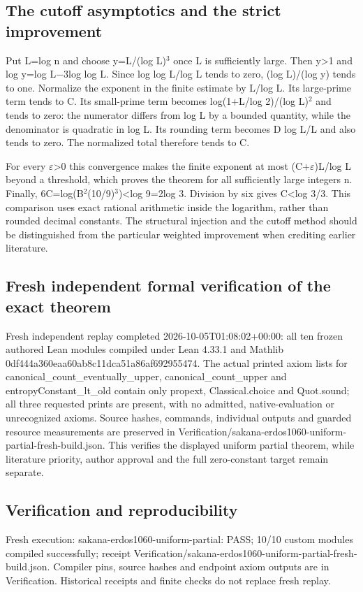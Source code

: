 \documentclass[11pt,a4paper]{article}
\begin{document}
\subsection{The cutoff asymptotics and the strict improvement}
Put L=log n and choose y=L/(log L)\ensuremath{^3} once L is sufficiently large. Then y>1 and log y=log L\ensuremath{-}3log log L. Since log log L/log L tends to zero, (log L)/(log y) tends to one. Normalize the exponent in the finite estimate by L/log L. Its large-prime term tends to C. Its small-prime term becomes log(1+L/log 2)/(log L)\ensuremath{^2} and tends to zero: the numerator differs from log L by a bounded quantity, while the denominator is quadratic in log L. Its rounding term becomes D log L/L and also tends to zero. The normalized total therefore tends to C.

For every \ensuremath{\varepsilon}>0 this convergence makes the finite exponent at most (C+\ensuremath{\varepsilon})L/log L beyond a threshold, which proves the theorem for all sufficiently large integers n. Finally, 6C=log(B\ensuremath{^2}(10/9)\ensuremath{^3})<log 9=2log 3. Division by six gives C<log 3/3. This comparison uses exact rational arithmetic inside the logarithm, rather than rounded decimal constants. The structural injection and the cutoff method should be distinguished from the particular weighted improvement when crediting earlier literature.

\subsection{Fresh independent formal verification of the exact theorem}
Fresh independent replay completed 2026-10-05T01:08:02+00:00: all ten frozen authored Lean modules compiled under Lean 4.33.1 and Mathlib 0df444a360eaa60ab8c11dca51a86af692955474. The actual printed axiom lists for canonical\_count\_eventually\_upper, canonical\_count\_upper and entropyConstant\_lt\_old contain only propext, Classical.choice and Quot.sound; all three requested prints are present, with no admitted, native-evaluation or unrecognized axioms. Source hashes, commands, individual outputs and guarded resource measurements are preserved in Verification/sakana-erdos1060-uniform-partial-fresh-build.json. This verifies the displayed uniform partial theorem, while literature priority, author approval and the full zero-constant target remain separate.

\subsection{Verification and reproducibility}
Fresh execution: sakana-erdos1060-uniform-partial: PASS; 10/10 custom modules compiled successfully; receipt Verification/sakana-erdos1060-uniform-partial-fresh-build.json. Compiler pins, source hashes and endpoint axiom outputs are in Verification. Historical receipts and finite checks do not replace fresh replay.
\end{document}
